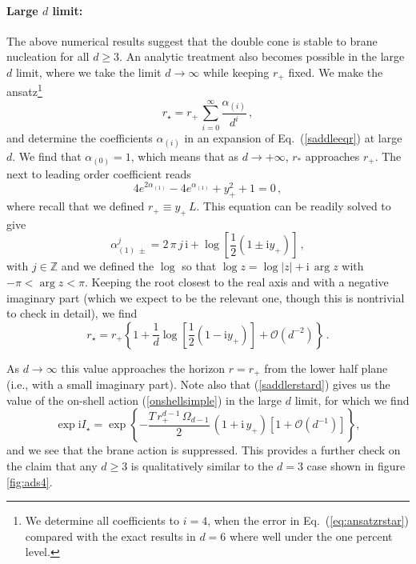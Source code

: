 \documentclass[11pt]{article}
\renewcommand{\i}{\mathrm{i}}
\begin{document}
\paragraph{Large $d$ limit:}
The above numerical results suggest that the double cone is stable to brane nucleation for all $d \ge 3$.
An analytic treatment also becomes possible in the large $d$ limit, where we take the limit $d\to \infty$ while keeping $r_+$ fixed.
We make the ansatz\footnote{We determine all coefficients to $i=4$, when the error in Eq.~(\ref{eq:ansatzrstar}) compared with the exact results in $d=6$ where well under the one percent level.}
\begin{equation}
r_\star=r_+\,\sum_{i=0}^{\infty}\frac{\alpha_{(i)}}{d^i}\,,
\label{eq:ansatzrstar}
\end{equation}
and determine the coefficients $\alpha_{(i)}$ in an expansion of Eq.~(\ref{saddleeqr}) at large $d$. 
We find that $\alpha_{(0)}=1$, which means that as $d\to+\infty$, $r_{*}$ approaches $r_+$. The next to leading order coefficient reads
\begin{equation}
4 e^{2 \alpha_{(1)} }-4 e^{\alpha_{(1)} }+y_+^2+1=0\,,
\end{equation}
where recall that we defined $r_+\equiv y_+\,L$. 
This equation can be readily solved to give
\begin{equation}
\alpha^{j}_{(1)\;\pm} = 2\,\pi\,j\,\i+\log\left[\frac{1}{2}(1\pm\i y_+)\right]\,,
\end{equation}
with $j\in \mathbb{Z}$ and we defined the $\log$ so that $\log z = \log |z|+\i\,\arg z$ with $-\pi< \arg z< \pi$. 
Keeping the root closest to the real axis and with a negative imaginary part (which we expect to be the relevant one, though this is nontrivial to check in detail), we find
\begin{equation}
r_\star = r_+\left\{1+\frac{1}{d}\log\left[\frac{1}{2}(1-\i y_+)\right]+\mathcal{O}(d^{-2})\right\}\,.
\label{saddlerstard}
\end{equation}

As $d \rightarrow \infty$ this value approaches the horizon $r=r_+$ from the lower half plane (i.e.,  with a small imaginary part).
Note also that (\ref{saddlerstard}) gives us the value of the on-shell action (\ref{onshellsimple}) in the large $d$ limit, for which we find
\begin{equation}
\exp \i I_\star = \exp\left\{-\frac{T\,r_+^{d-1}\,\Omega _{d-1}}{2}\,(1+\i\,y_+)\left[1+\mathcal{O}(d^{-1})\right]\right\},
\end{equation}
and we see that the brane action is suppressed.  
This provides a further check on the claim that any $d \ge 3$ is qualitatively similar to the $d=3$ case shown in figure \ref{fig:ads4}.
\end{document}
